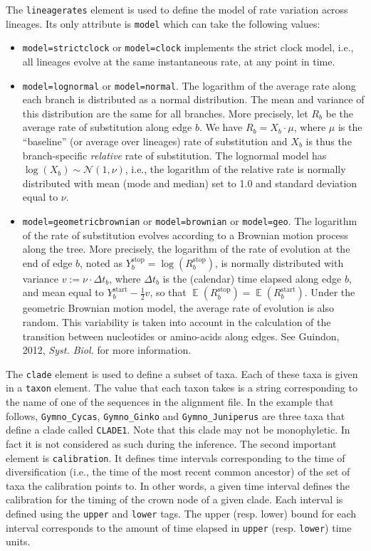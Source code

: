 \documentclass[a4paper,12pt]{article}
\newcommand{\x}[1]{\texttt{#1}}
\DeclareMathOperator*{\Ex}{\mathbb{E}}
\begin{document}
The \x{lineagerates} element is used to define the model of rate
variation across lineages. Its only attribute is \x{model} which can take the following values:
\begin{itemize}
\item \x{model=strictclock} or \x{model=clock}  implements the strict clock model, i.e., all lineages
  evolve at the same instantaneous rate, at any point in time.
\item \x{model=lognormal} or \x{model=normal}. The logarithm of the average rate along each branch is distributed as a
  normal distribution. The mean and variance of this distribution are the same for all branches. More
  precisely, let $R_b$ be the average rate of substitution along edge $b$. We have $R_b=X_b\cdot
  \mu$, where $\mu$ is the ``baseline'' (or average over lineages) rate of substitution and $X_b$ is
  thus the branch-specific {\em relative} rate of substitution. The lognormal model has $\log(X_b)
  \sim \mathcal{N}(1,\nu)$, i.e., the logarithm of the relative rate is normally distributed with
  mean (mode and median) set to 1.0 and standard deviation equal to $\nu$.
\item \x{model=geometricbrownian} or \x{model=brownian} or \x{model=geo}. The logarithm of the rate
  of substitution evolves according to a Brownian motion process along the tree. More precisely, the
  logarithm of the rate of evolution at the end of edge $b$, noted as $Y_b^{\text{stop}}=\log(R_b^{\text{stop}})$, is
  normally distributed with variance $v := \nu \cdot \Delta t_b$, where $\Delta t_b$ is the (calendar) time elapsed
  along edge $b$, and mean equal to $Y_b^{\text{start}}-\frac{1}{2} v$, so that $\Ex(R_b^{\text{stop}})=\Ex(R_b^{\text{start}})$.
  Under the geometric Brownian motion model, the average rate of evolution is also random. This
  variability is taken into account in the calculation of the transition between nucleotides or
  amino-acids along edges. See Guindon, 2012, {\em Syst. Biol.} for more information.
\end{itemize}

The \x{clade} element is used to define a subset of taxa. Each of these taxa is
given in a \x{taxon} element. The  value that each taxon takes is a string corresponding to the
name of one of the sequences in the alignment file. In the example that follows, \x{Gymno\_Cycas}, \x{Gymno\_Ginko} and
\x{Gymno\_Juniperus} are three taxa that define a clade called \x{CLADE1}. Note that  this clade may
not be monophyletic. In fact it is not considered as such during the inference. The second important element is \x{calibration}. It
defines time intervals corresponding to the time of diversification (i.e., the time of the most
recent common ancestor) of the set of taxa the calibration points to. In other words, a given time
interval defines the calibration for the timing of the crown node of a given clade. Each interval is defined using 
the \x{upper} and \x{lower} tags. The upper (resp. lower) bound for each interval corresponds to the amount of time elapsed
in \x{upper} (resp. \x{lower}) time units.
\end{document}
